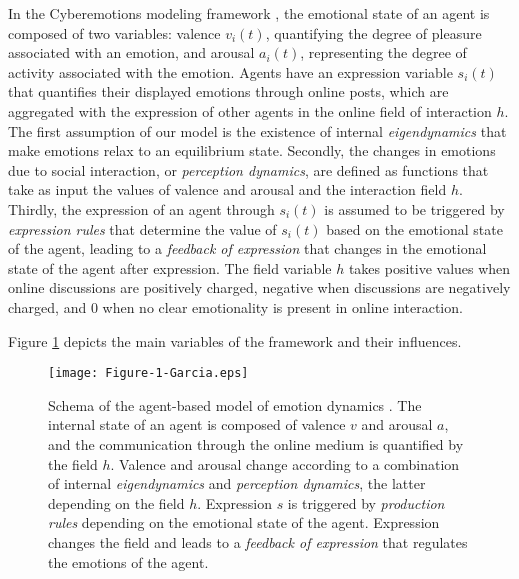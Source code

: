 \documentclass[nologo,url,11pt,a4paper]{ETHpaper}
\begin{document}
In the Cyberemotions modeling framework \cite{Schweitzer2010}, the emotional state  of an agent is composed of two variables: valence $v_i(t)$, quantifying the degree of pleasure associated with an emotion, and arousal $a_i(t)$, representing the degree of activity associated with the emotion.  
Agents have an expression variable $s_i(t)$ that quantifies their displayed emotions through online posts, which are aggregated with the expression of other agents in the online field of interaction $h$. 
The first assumption of our model is the existence of internal \emph{eigendynamics}
that make emotions relax to an equilibrium state. 
Secondly, the changes in emotions due to social interaction, or \emph{perception dynamics}, are defined as functions that  take as input the values of valence and arousal and the interaction field $h$.
Thirdly, the expression of an agent through $s_i(t)$ is assumed to be triggered by \emph{expression rules} that determine the value of $s_i(t)$ based on the emotional state of the agent, leading to a \emph{feedback of expression} that changes in the emotional state of the agent after expression.
The field variable $h$ takes positive values when online discussions are positively charged, negative when discussions are negatively charged, and $0$ when no clear emotionality is present in online interaction. 

Figure \ref{fig:dynSchema} depicts the main variables of the framework and their influences.

\begin{figure}[ht] 
\centering
\texttt{[image: Figure-1-Garcia.eps]}
\caption{Schema of the agent-based model of emotion dynamics \cite{Schweitzer2010,Garcia2011}.
The internal state of an agent is composed of valence $v$ and arousal $a$, and the communication through the online medium is quantified by the field $h$. 
Valence and arousal change according to  a combination of internal \textit{eigendynamics} and \textit{perception dynamics}, the latter  depending on the field $h$. 
Expression $s$ is triggered by \textit{production rules} depending on the emotional state of the agent.
Expression changes the field and leads to a \textit{feedback of expression} that regulates the emotions of the agent. \label{fig:dynSchema} }  \end{figure}
\end{document}
